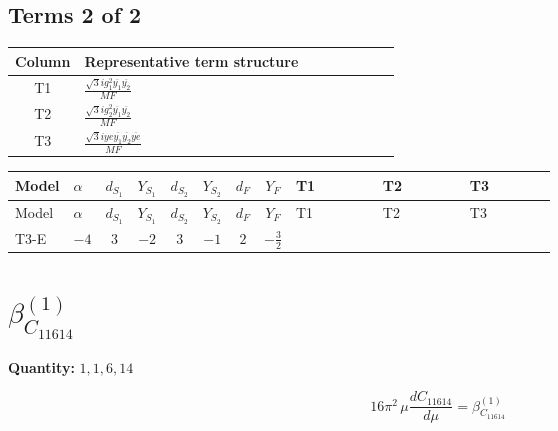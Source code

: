 \documentclass[8pt]{article}
\begin{document}
\begin{landscape}
\subsection*{Terms 2 of 2}
\begin{center}
\begin{tabular}{@{}c >{\raggedright\arraybackslash}p{0.82\linewidth}@{}}
\toprule
Column & Representative term structure \\
\midrule
T1 & \(\displaystyle \frac{\sqrt{3} i g_{1}^{2} \overline{y_{1}} \overline{y_{2}}}{MF}\) \\
\midrule
T2 & \(\displaystyle \frac{\sqrt{3} i g_{2}^{2} \overline{y_{1}} \overline{y_{2}}}{MF}\) \\
\midrule
T3 & \(\displaystyle \frac{\sqrt{3} i ye \overline{y_{1}} \overline{y_{2}} \overline{ye}}{MF}\) \\
\midrule
\bottomrule
\end{tabular}
\end{center}
\smallskip
\tiny
\begin{longtable}{@{}llcccccc >{\raggedright\arraybackslash}p{0.21\linewidth} >{\raggedright\arraybackslash}p{0.21\linewidth} >{\raggedright\arraybackslash}p{0.21\linewidth}@{}}
\toprule
Model & $\alpha$ & $d_{S_1}$ & $Y_{S_1}$ & $d_{S_2}$ & $Y_{S_2}$ & $d_F$ & $Y_F$ & T1 & T2 & T3 \\
\midrule
\endfirsthead
\toprule
Model & $\alpha$ & $d_{S_1}$ & $Y_{S_1}$ & $d_{S_2}$ & $Y_{S_2}$ & $d_F$ & $Y_F$ & T1 & T2 & T3 \\
\midrule
\endhead
T3-E & $-4$ & $3$ & $-2$ & $3$ & $-1$ & $2$ & $-\frac{3}{2}$ & \scriptsize\adjustbox{max width=\linewidth}{$\begin{gathered} \frac{9 \sqrt{3} i g_{1}^{2} \overline{y_{1}} \overline{y_{2}}}{8 MF}\end{gathered}$} & \scriptsize\adjustbox{max width=\linewidth}{$\begin{gathered} \frac{11 \sqrt{3} i g_{2}^{2} \overline{y_{1}} \overline{y_{2}}}{8 MF}\end{gathered}$} & \scriptsize\adjustbox{max width=\linewidth}{$\begin{gathered} - \frac{\sqrt{3} i ye \overline{y_{1}} \overline{y_{2}} \overline{ye}}{12 MF}\end{gathered}$} \\
\midrule
\bottomrule
\end{longtable}
\clearpage
\section*{$\beta_{C_{11614}}^{(1)}$}
\noindent\textbf{Quantity: }$\mathrm{1,1,6,14}$\par\smallskip
\[16\pi^2\,\mu\frac{d C_{11614}}{d\mu}=\beta_{C_{11614}}^{(1)}\]

\end{landscape}
\end{document}

